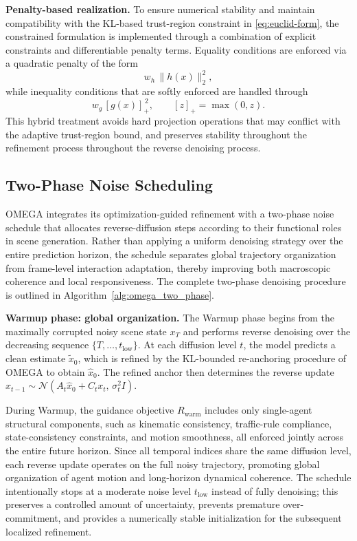 \documentclass[10pt,twocolumn,letterpaper]{article}
\theoremstyle{plain}
\theoremstyle{remark}
\renewcommand{\paragraph}[1]{\vspace{.5em}\noindent\textbf{#1.}}
\begin{document}
\paragraph{Penalty-based realization}
To ensure numerical stability and maintain compatibility with
the KL-based trust-region constraint in \cref{eq:euclid-form},
the constrained formulation is implemented through a combination of explicit constraints and differentiable penalty terms.
Equality conditions are enforced via a quadratic penalty of the form
\[
w_h\,\|h(x)\|_2^2,
\]
while inequality conditions that are softly enforced are handled through
\[
w_g\, [g(x)]_+^{\,2},
\qquad
[z]_+ = \max(0,z).
\]
This hybrid treatment avoids hard projection operations that may conflict with the adaptive trust-region bound, and preserves stability throughout the refinement process throughout the reverse denoising
process.

\subsection{Two-Phase Noise Scheduling}
\label{app:two_phase_schedule}

OMEGA integrates its optimization-guided refinement with a
two-phase noise schedule that allocates reverse-diffusion steps
according to their functional roles in scene generation.
Rather than applying a uniform denoising strategy over the entire
prediction horizon, the schedule separates global trajectory
organization from frame-level interaction adaptation, thereby
improving both macroscopic coherence and local responsiveness. The complete two-phase denoising procedure is outlined in 
Algorithm~\ref{alg:omega_two_phase}.

\paragraph{Warmup phase: global organization}
The Warmup phase begins from the maximally corrupted noisy scene
state $x_T$ and performs reverse denoising over the decreasing
sequence $\{T, \dots, t_{\mathrm{low}}\}$.  
At each diffusion level $t$, the model predicts a clean estimate
$\tilde{x}_0$, which is refined by the KL-bounded re-anchoring
procedure of OMEGA to obtain $\hat{x}_0$.  
The refined anchor then determines the reverse update
$x_{t-1} \sim \mathcal{N}(A_t \hat{x}_0 + C_t x_t,\,
\sigma_t^2 I)$.

During Warmup, the guidance objective $R_{\mathrm{warm}}$ includes
only single-agent structural components, such as kinematic
consistency, traffic-rule compliance, state-consistency
constraints, and motion smoothness, all enforced jointly across
the entire future horizon.  
Since all temporal indices share the same diffusion level, each
reverse update operates on the full noisy trajectory, promoting
global organization of agent motion and long-horizon dynamical
coherence.  
The schedule intentionally stops at a moderate noise level
$t_{\mathrm{low}}$ instead of fully denoising; this preserves a
controlled amount of uncertainty, prevents premature
over-commitment, and provides a numerically stable initialization
for the subsequent localized refinement.
\end{document}
